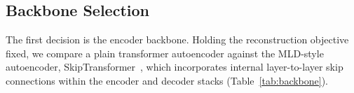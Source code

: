 \documentclass[letterpaper]{article} %
\begin{document}






\subsection{Backbone Selection} %
\label{sec:step1}
The first decision is the encoder backbone. Holding the reconstruction objective fixed, we compare a plain transformer autoencoder against the MLD-style autoencoder, SkipTransformer~\citep{chen2023mld}, which
incorporates internal layer-to-layer skip connections within the encoder and decoder stacks (Table~\ref{tab:backbone}).

\begin{table}[htbp]
\centering
\caption{Raw Spearman correlations for reconstruction autoencoders ($n=25$, mean $\pm$ SE).
Bold: best (highest mean) in each column.}
\setlength{\tabcolsep}{4pt}
\small
{}~\label{tab:backbone}
\end{table}
\end{document}
